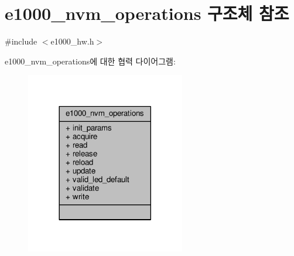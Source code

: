 \hypertarget{structe1000__nvm__operations}{}\section{e1000\+\_\+nvm\+\_\+operations 구조체 참조}
\label{structe1000__nvm__operations}


{\ttfamily \#include $<$e1000\+\_\+hw.\+h$>$}



e1000\+\_\+nvm\+\_\+operations에 대한 협력 다이어그램\+:
\nopagebreak
\begin{figure}[H]
\begin{center}
\leavevmode
\includegraphics[width=197pt]{structe1000__nvm__operations__coll__graph}
\end{center}
\end{figure}
